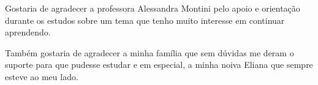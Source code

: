 \begin{agradecimentos}
Gostaria de agradecer a professora Alessandra Montini pelo apoio e orientação durante os estudos sobre um tema que tenho muito interesse em continuar aprendendo.

Também gostaria de agradecer a minha família que sem dúvidas me deram o suporte para que pudesse estudar e em especial, a minha noiva Eliana que sempre esteve ao meu lado.

\end{agradecimentos}
